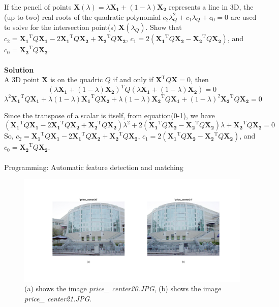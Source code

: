 \documentclass{../../assignment}
\begin{document}
\begin{problemlist}
If the pencil of points $\mathbf{X}(\lambda) = \lambda\mathbf{X_1} + (1 - \lambda)\mathbf{X_2}$ represents a line in 3D, the (up to two) real roots of the quadratic polynomial $c_2\lambda_Q^2+c_1\lambda_Q+c_0=0$ are used to solve for the intersection point(s) $\mathbf{X}(\lambda_Q)$. Show that $c_2=\mathbf{X_1}^\mathrm{T}Q\mathbf{X_1}-2\mathbf{X_1}^\mathrm{T}Q\mathbf{X_2}+\mathbf{X_2}^\mathrm{T}Q\mathbf{X_2}$, $c_1=2(\mathbf{X_1}^\mathrm{T}Q\mathbf{X_2}-\mathbf{X_2}^\mathrm{T}Q\mathbf{X_2})$, and $c_0=\mathbf{X_2}^\mathrm{T}Q\mathbf{X_2}$.
\\\\
\textbf{Solution}\\
A 3D point $\mathbf{X}$ is on the quadric $Q$ if and only if $\mathbf{X}^\mathrm{T}Q\mathbf{X}=0$, then
\begin{equation}
(\lambda\mathbf{X_1} + (1 - \lambda)\mathbf{X_2})^\mathrm{T}Q(\lambda\mathbf{X_1} + (1 - \lambda)\mathbf{X_2})=0
\end{equation}
\begin{equation}
\lambda^2\mathbf{X_1}^\mathrm{T}Q\mathbf{X_1}+
\lambda(1-\lambda)\mathbf{X_1}^\mathrm{T}Q\mathbf{X_2}+
\lambda(1-\lambda)\mathbf{X_2}^\mathrm{T}Q\mathbf{X_1}+
(1-\lambda)^2\mathbf{X_2}^\mathrm{T}Q\mathbf{X_2}=0
\end{equation}

Since the transpose of a scalar is itself, from equation(0-1), we have
\begin{equation}
(\mathbf{X_1}^\mathrm{T}Q\mathbf{X_1}-2\mathbf{X_1}^\mathrm{T}Q\mathbf{X_2}+\mathbf{X_2}^\mathrm{T}Q\mathbf{X_2})\lambda^2+
2(\mathbf{X_1}^\mathrm{T}Q\mathbf{X_2}-\mathbf{X_2}^\mathrm{T}Q\mathbf{X_2})\lambda+
\mathbf{X_2}^\mathrm{T}Q\mathbf{X_2}=0
\end{equation}
So, $c_2=\mathbf{X_1}^\mathrm{T}Q\mathbf{X_1}-2\mathbf{X_1}^\mathrm{T}Q\mathbf{X_2}+\mathbf{X_2}^\mathrm{T}Q\mathbf{X_2}$, $c_1=2(\mathbf{X_1}^\mathrm{T}Q\mathbf{X_2}-\mathbf{X_2}^\mathrm{T}Q\mathbf{X_2})$, and $c_0=\mathbf{X_2}^\mathrm{T}Q\mathbf{X_2}$.
\\\\
\pbitem Programming: Automatic feature detection and matching

\begin{figure}[H]
  \includegraphics[width=\textwidth]{InputImage}
\caption{(a) shows the image \emph{price\_ center20.JPG}, (b) shows the image \emph{price\_ center21.JPG}.}
\end{figure}


\end{problemlist}
\end{document}
